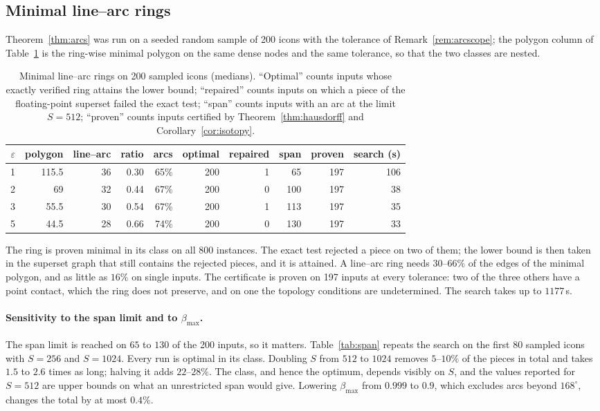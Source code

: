 \documentclass[11pt,a4paper]{article}
\theoremstyle{definition}
\theoremstyle{remark}
\begin{document}
\subsection{Minimal line--arc rings}\label{sec:arc-results}

Theorem~\ref{thm:arcs} was run on a seeded random sample of 200 icons with the
tolerance of Remark~\ref{rem:arcscope}; the polygon column of
Table~\ref{tab:arcs} is the ring-wise minimal polygon on the same dense nodes
and the same tolerance, so that the two classes are nested.

\begin{table}[h]
\centering
\caption{Minimal line--arc rings on 200 sampled icons (medians). ``Optimal''
counts inputs whose exactly verified ring attains the lower bound;
``repaired'' counts inputs on which a piece of the floating-point superset
failed the exact test; ``span'' counts inputs with an arc at the limit
$S=512$; ``proven'' counts inputs certified by
Theorem~\ref{thm:hausdorff} and Corollary~\ref{cor:isotopy}.}
\label{tab:arcs}
\begin{tabular}{rrrrrrrrrr}
\toprule
$\varepsilon$ & polygon & line--arc & ratio & arcs & optimal & repaired & span & proven & search (s)\\
\midrule
1 & 115.5 & 36 & 0.30 & 65\% & 200 & 1 & 65 & 197 & 106\\
2 & 69 & 32 & 0.44 & 67\% & 200 & 0 & 100 & 197 & 38\\
3 & 55.5 & 30 & 0.54 & 67\% & 200 & 1 & 113 & 197 & 35\\
5 & 44.5 & 28 & 0.66 & 74\% & 200 & 0 & 130 & 197 & 33\\
\bottomrule
\end{tabular}
\end{table}

The ring is proven minimal in its class on all 800 instances. The exact test
rejected a piece on two of them; the lower bound is then taken in the
superset graph that still contains the rejected pieces, and it is attained.
A line--arc ring needs $30$--$66\%$ of the edges of the minimal polygon, and
as little as $16\%$ on single inputs. The certificate is proven on 197 inputs
at every tolerance: two of the three others have a point contact, which the
ring does not preserve, and on one the topology conditions are undetermined.
The search takes up to $1177$\,s.

\paragraph{Sensitivity to the span limit and to $\beta_{\max}$.} The span
limit is reached on $65$ to $130$ of the 200 inputs, so it matters.
Table~\ref{tab:span} repeats the search on the first 80 sampled icons with
$S=256$ and $S=1024$. Every run is optimal in its class. Doubling $S$ from
$512$ to $1024$ removes $5$--$10\%$ of the pieces in total and takes $1.5$ to
$2.6$ times as long; halving it adds $22$--$28\%$. The class, and hence the
optimum, depends visibly on $S$, and the values reported for $S=512$ are
upper bounds on what an unrestricted span would give. Lowering
$\beta_{\max}$ from $0.999$ to $0.9$, which excludes arcs beyond $168^\circ$,
changes the total by at most $0.4\%$.
\end{document}
